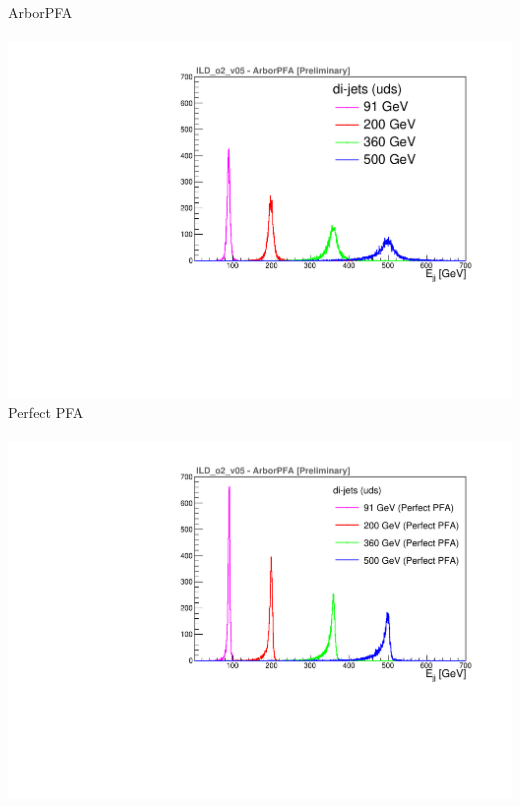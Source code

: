 \documentclass[8pt]{beamer}
\begin{document}
\begin{frame}
\begin{minipage}{0.48\linewidth}
        \begin{center}
          ArborPFA \\
          ~~~~~\includegraphics[width=\linewidth]{ILDArborPFA_ERec_NoNeutralHadron.pdf} \\
          Perfect PFA \\
          ~~~~~\includegraphics[width=\linewidth]{ILDArborPFA_PerfectERec_NoNeutralHadron.pdf} \\
        \end{center}
      \end{minipage}
    \end{frame}
\end{document}

